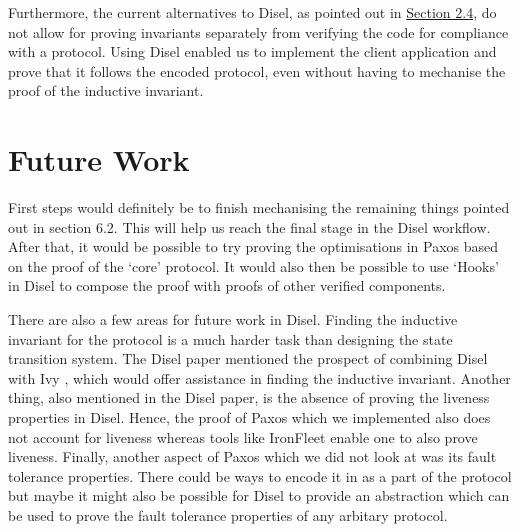 Furthermore, the current alternatives to Disel, as pointed out in
\hyperref[sec:relatedWork]{Section 2.4}, do not allow for proving invariants
separately from verifying the code for compliance with a protocol. Using
Disel enabled us to implement the client application and prove that it
follows the encoded protocol, even without having to mechanise the proof of the
inductive invariant.


\section{Future Work}
First steps would definitely be to finish mechanising the remaining things
pointed out in section 6.2. This will help us reach the final stage in the Disel
workflow. After that, it would be possible to try proving the optimisations
in Paxos based on the proof of the `core' protocol. It would also then be possible
to use `Hooks' \cite{9} in Disel to compose the proof with proofs of other
verified components.

There are also a few areas for future work in Disel.
Finding the inductive invariant for the protocol is a much harder task than
designing the state transition system. The Disel paper \cite{9} mentioned the prospect
of combining Disel with Ivy \cite{19}, which would offer assistance in finding
the inductive invariant. Another thing, also mentioned in the Disel paper, is
the absence of proving the liveness properties in Disel. Hence, the proof of
Paxos which we implemented also does not account for liveness whereas tools like
IronFleet \cite{15} enable one to also prove liveness.
Finally, another aspect of Paxos which we did not look at was its fault
tolerance properties. There could be ways to encode it in as a part of the
protocol but maybe it might also be possible for Disel to provide an
abstraction which can be used to prove the fault tolerance properties of
any arbitary protocol.
